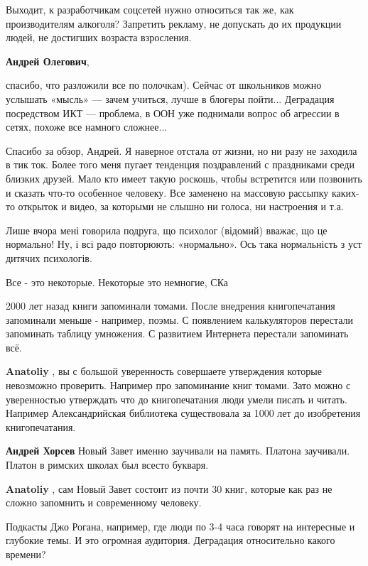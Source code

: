 \begin{itemize}

Выходит, к разработчикам соцсетей нужно относиться так же, как производителям
алкоголя? Запретить рекламу, не допускать до их продукции людей, не достигших
возраста взросления.


\textbf{Андрей Олегович}, 

спасибо, что разложили все по полочкам). Сейчас от школьников можно услышать
«мысль» — зачем учиться, лучше в блогеры пойти... Деградация посредством ИКТ —
проблема, в ООН уже поднимали вопрос об агрессии в сетях, похоже все намного
сложнее...


Спасибо за обзор, Андрей. Я наверное отстала от жизни, но ни разу не заходила в
тик ток. Более того меня пугает тенденция поздравлений с праздниками среди
близких друзей. Мало кто имеет такую роскошь, чтобы встретится или позвонить и
сказать что-то особенное человеку. Все заменено на массовую рассыпку каких-то
открыток и видео, за которыми не слышно ни голоса, ни настроения и т.а.


Лише вчора мені говорила подруга, що психолог (відомий) вважає, що це
нормально! Ну, і всі радо повторюють: «нормально». Ось така нормальність з уст
дитячих психологів.

Все - это некоторые. Некоторые это немногие, СКа


2000 лет назад книги запоминали томами. После внедрения книгопечатания
запоминали меньше - например, поэмы. С появлением калькуляторов перестали
запоминать таблицу умножения. С развитием Интернета перестали запоминать всё.

\begin{itemize} %
\textbf{Anatoliy} , вы с большой уверенность совершаете утверждения которые невозможно проверить.
Например про запоминание книг томами.
Зато можно с уверенностью утверждать что до книгопечатания люди умели писать и читать.
Например Александрийская библиотека существовала за 1000 лет до изобретения книгопечатания.

\textbf{Андрей Хорсев} Новый Завет именно заучивали на память. Платона заучивали. Платон в римских школах был всесто букваря.

\textbf{Anatoliy} , сам Новый Завет состоит из почти 30 книг, которые как раз не сложно запомнить и современному человеку.
\end{itemize} %


Подкасты Джо Рогана, например, где люди по 3-4 часа говорят на интересные и
глубокие темы. И это огромная аудитория. Деградация относительно какого
времени?

\end{itemize} %
